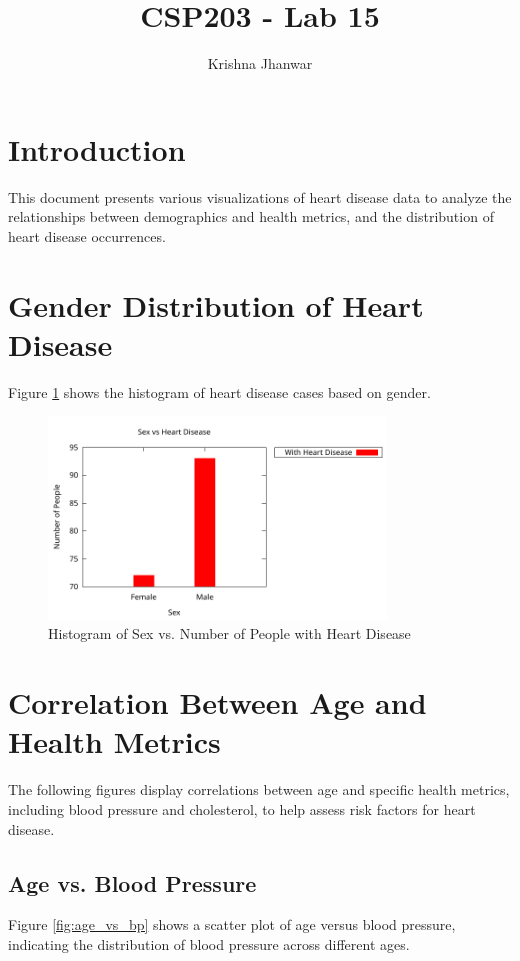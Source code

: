 \documentclass{article}
\title{CSP203 - Lab 15}
\author{Krishna Jhanwar}
\date{}
\begin{document}
	
	\maketitle
	
	\section{Introduction}
	This document presents various visualizations of heart disease data to analyze the relationships between demographics and health metrics, and the distribution of heart disease occurrences.
	
	\section{Gender Distribution of Heart Disease}
	Figure \ref{fig:gender_histogram} shows the histogram of heart disease cases based on gender.
	
	\begin{figure}[h]
		\centering
		\includegraphics[width=0.8\textwidth]{q4-a.pdf}
		\caption{Histogram of Sex vs. Number of People with Heart Disease}
		\label{fig:gender_histogram}
	\end{figure}
	
	\section{Correlation Between Age and Health Metrics}
	
	The following figures display correlations between age and specific health metrics, including blood pressure and cholesterol, to help assess risk factors for heart disease.
	
	\subsection{Age vs. Blood Pressure}
	Figure \ref{fig:age_vs_bp} shows a scatter plot of age versus blood pressure, indicating the distribution of blood pressure across different ages.
	
\end{document}
